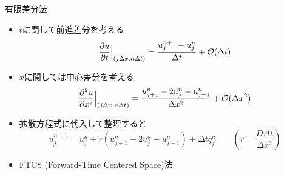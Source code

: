 \begin{frame}[t]{有限差分法}
  \begin{itemize}
  \item $t$に関して前進差分を考える
    \[
    \frac{\partial u}{\partial t} \Big|_{(j \Delta x, n \Delta t)} = \frac{u_j^{n+1} - u_j^n}{\Delta t} + {\cal O}(\Delta t)
    \]
  \item $x$に関しては中心差分を考える
    \[
    \frac{\partial^2 u}{\partial x^2} \Big|_{(j \Delta x, n \Delta t)} = \frac{u_{j+1}^{n} - 2 u_{j}^{n} + u_{j-1}^{n}}{\Delta x^2} + {\cal O}(\Delta x^2)
    \]
  \item 拡散方程式に代入して整理すると
    \[
    u_{j}^{n+1} = u_{j}^{n} + r (u_{j+1}^{n} - 2 u_{j}^{n} + u_{j-1}^{n}) + \Delta t q_{j}^{n} \qquad (r = \frac{D\Delta t}{\Delta x^2})
    \]
  \item FTCS (Forward-Time Centered Space)法
  \end{itemize}
\end{frame}
